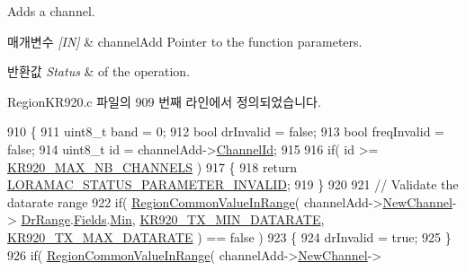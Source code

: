 Adds a channel. 


\begin{DoxyParams}{매개변수}
{\em \mbox{[}\+I\+N\mbox{]}} & channel\+Add Pointer to the function parameters.\\
\hline
\end{DoxyParams}

\begin{DoxyRetVals}{반환값}
{\em Status} & of the operation. \\
\hline
\end{DoxyRetVals}


Region\+K\+R920.\+c 파일의 909 번째 라인에서 정의되었습니다.


\begin{DoxyCode}
910 \{
911     uint8\_t band = 0;
912     \textcolor{keywordtype}{bool} drInvalid = \textcolor{keyword}{false};
913     \textcolor{keywordtype}{bool} freqInvalid = \textcolor{keyword}{false};
914     uint8\_t \textcolor{keywordtype}{id} = channelAdd->\mbox{\hyperlink{structs_channel_add_params_ae23f953dc29c360e56a3c856404a3276}{ChannelId}};
915 
916     \textcolor{keywordflow}{if}( \textcolor{keywordtype}{id} >= \mbox{\hyperlink{group___r_e_g_i_o_n_k_r920_ga28705c59a2c19a1de8b22d294fc6bebb}{KR920\_MAX\_NB\_CHANNELS}} )
917     \{
918         \textcolor{keywordflow}{return} \mbox{\hyperlink{group___l_o_r_a_m_a_c_gga1d18f26b344040b3ec5c3db662919661ad0d3119f247d00e1787dda106fcb3017}{LORAMAC\_STATUS\_PARAMETER\_INVALID}};
919     \}
920 
921     \textcolor{comment}{// Validate the datarate range}
922     \textcolor{keywordflow}{if}( \mbox{\hyperlink{group___r_e_g_i_o_n_c_o_m_m_o_n_gafdd1c80d953e18d755a631b72a9c3bd3}{RegionCommonValueInRange}}( channelAdd->\mbox{\hyperlink{structs_channel_add_params_afc31493a105479490228fd896b20b45c}{NewChannel}}->
      \mbox{\hyperlink{structs_channel_params_ad4d9b041ea740886a05fa8a1d06997a2}{DrRange}}.\mbox{\hyperlink{unionu_dr_range_a5bdb9afc17112f2ae5f9548f0aee964f}{Fields}}.\mbox{\hyperlink{structu_dr_range_1_1s_fields_ad870086364c5eb410eec40e1025e3203}{Min}}, \mbox{\hyperlink{group___r_e_g_i_o_n_k_r920_ga9eff66e6e0242d6a7563dd346a56e3ab}{KR920\_TX\_MIN\_DATARATE}}, 
      \mbox{\hyperlink{group___r_e_g_i_o_n_k_r920_ga58a4171632a233925b8b0153c66a6ff3}{KR920\_TX\_MAX\_DATARATE}} ) == \textcolor{keyword}{false} )
923     \{
924         drInvalid = \textcolor{keyword}{true};
925     \}
926     \textcolor{keywordflow}{if}( \mbox{\hyperlink{group___r_e_g_i_o_n_c_o_m_m_o_n_gafdd1c80d953e18d755a631b72a9c3bd3}{RegionCommonValueInRange}}( channelAdd->\mbox{\hyperlink{structs_channel_add_params_afc31493a105479490228fd896b20b45c}{NewChannel}}->

\end{DoxyCode}
